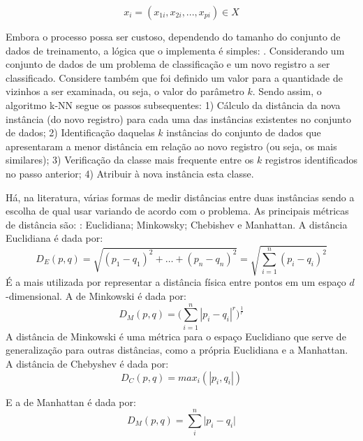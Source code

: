 \begin{equation}\label{eq:vetor-pdimensional}
x_{i}=(x_{1i},x_{2i},...,x_{pi})\in X
\end{equation}

Embora o processo possa ser custoso, dependendo do tamanho do conjunto de dados de treinamento, a lógica que o implementa é simples: \cite{Boscarioli2017} \cite{bruce_estatistica_2019} \cite{goldschmidt2005}. Considerando um conjunto de dados de um problema de classificação e um novo registro a ser classificado. Considere também que foi definido um valor para a quantidade de vizinhos a ser examinada, ou seja, o valor do parâmetro $ k $. Sendo assim, o algoritmo k-NN segue os passos subsequentes: 1) Cálculo da distância da nova instância (do novo registro) para cada uma das instâncias existentes no conjunto de dados; 	2) Identificação daquelas $k$ instâncias do conjunto de dados que apresentaram a menor distância em relação ao novo registro (ou seja, os mais similares);	3) Verificação da classe mais frequente entre os $ k $ registros identificados no passo anterior; 4) Atribuir à nova instância esta classe.

Há, na literatura, várias formas de medir distâncias entre duas instâncias sendo a escolha de qual usar variando de acordo com o problema. As principais métricas de distância são: \cite{Boscarioli2017} \cite{alpaydin_introduction_2014} \cite{classification2013}: Euclidiana; Minkowsky; Chebishev e Manhattan. A distância Euclidiana é dada por:
\begin{equation}\label{eq:euclidiana}
D_E(p,q) = \sqrt{(p_1 - q_1)^2 + \dots + (p_n - q_n)^2} = \sqrt{\sum_{i=1}^n (p_i - q_i)^2}
\end{equation}
É a mais utilizada por representar a distância física entre pontos em um espaço $d$-dimensional. A de Minkowski é dada por:
\begin{equation}\label{eq:minkowiski}
D_M(p,q) =  \Big(\sum_{i=1}^n |p_i-q_i|^r \Big) ^\frac{1}{r}
\end{equation}
A distância de Minkowski é uma métrica para o espaço Euclidiano que serve de generalização para outras distâncias, como a própria Euclidiana e a Manhattan. A distância de Chebyshev é dada por:
\begin{equation}\label{eq:chebyshev}
D_C(p,q) = max_i(|p_i, q_i|)
\end{equation}

E a de Manhattan é dada por:
\begin{equation}\label{eq:manhattan}
D_M(p,q) = \sum_{i}^{n} \big| p_i - q_i \big| 
\end{equation}


